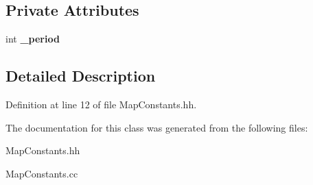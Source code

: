 \subsection*{Private Attributes}
\begin{DoxyCompactItemize}
\item 
int {\bfseries \_\-period}\label{classTBTrack_1_1MapConstants_a136a931938bf1830db32ecd17745e4a5}

\end{DoxyCompactItemize}


\subsection{Detailed Description}


Definition at line 12 of file MapConstants.hh.

The documentation for this class was generated from the following files:\begin{DoxyCompactItemize}
\item 
MapConstants.hh\item 
MapConstants.cc\end{DoxyCompactItemize}
